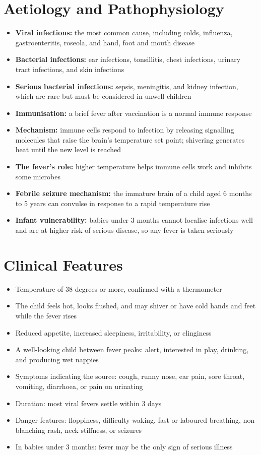 \section*{Aetiology and Pathophysiology}
\begin{itemize}
    \item \textbf{Viral infections:} the most common cause, including colds, influenza, gastroenteritis, roseola, and hand, foot and mouth disease
    \item \textbf{Bacterial infections:} ear infections, tonsillitis, chest infections, urinary tract infections, and skin infections
    \item \textbf{Serious bacterial infections:} sepsis, meningitis, and kidney infection, which are rare but must be considered in unwell children
    \item \textbf{Immunisation:} a brief fever after vaccination is a normal immune response
    \item \textbf{Mechanism:} immune cells respond to infection by releasing signalling molecules that raise the brain's temperature set point; shivering generates heat until the new level is reached
    \item \textbf{The fever's role:} higher temperature helps immune cells work and inhibits some microbes
    \item \textbf{Febrile seizure mechanism:} the immature brain of a child aged 6 months to 5 years can convulse in response to a rapid temperature rise
    \item \textbf{Infant vulnerability:} babies under 3 months cannot localise infections well and are at higher risk of serious disease, so any fever is taken seriously
\end{itemize}

\section*{Clinical Features}
\begin{itemize}
    \item Temperature of 38 degrees or more, confirmed with a thermometer
    \item The child feels hot, looks flushed, and may shiver or have cold hands and feet while the fever rises
    \item Reduced appetite, increased sleepiness, irritability, or clinginess
    \item A well-looking child between fever peaks: alert, interested in play, drinking, and producing wet nappies
    \item Symptoms indicating the source: cough, runny nose, ear pain, sore throat, vomiting, diarrhoea, or pain on urinating
    \item Duration: most viral fevers settle within 3 days
    \item Danger features: floppiness, difficulty waking, fast or laboured breathing, non-blanching rash, neck stiffness, or seizures
    \item In babies under 3 months: fever may be the only sign of serious illness
\end{itemize}

